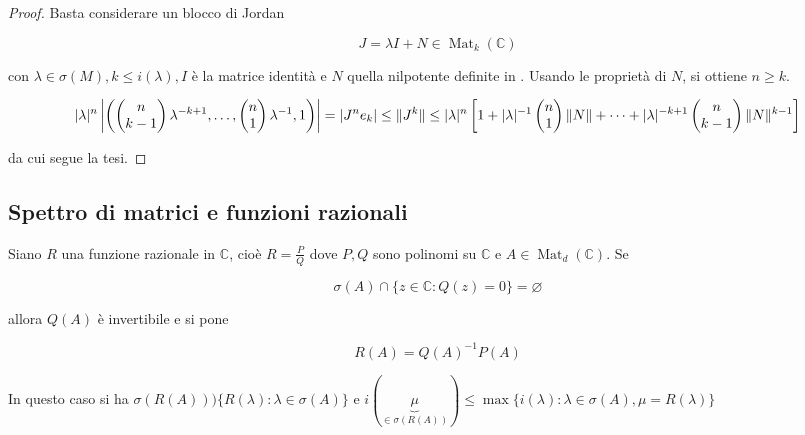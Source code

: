 \documentclass[hidelinks, 10pt]{report}
\DeclareMathOperator{\Mat}{Mat}
\begin{document}
\begin{proof}
Basta considerare un blocco di Jordan

\[ J = \lambda I + N \in \Mat_{k}(\mathbb{C}) \]

con $ \lambda \in \sigma(M), k \le i(\lambda), I $ \`e la matrice identit\`a e $ N $ quella nilpotente definite in . Usando le propriet\`a di $ N $, si ottiene $ n \ge k $. 

\begin{dmath*}
{ \vert \lambda \vert^{n} \left\vert \left( \begin{pmatrix} n \\ k - 1 \end{pmatrix} \lambda^{-k + 1}, \dotsc, \begin{pmatrix} n \\ 1 \end{pmatrix} \lambda^{-1}, 1 \right) \right\vert } = { \vert J^{n} e_{k} \vert } \le { \Vert J^{k} \Vert } \\ \le { \vert \lambda \vert^{n} \left[  1 + \vert \lambda \vert^{-1} \begin{pmatrix} n \\ 1 \end{pmatrix} \Vert N \Vert + \dotsb + \vert \lambda \vert^{-k + 1} \begin{pmatrix} n \\ k - 1 \end{pmatrix} \Vert N \Vert^{k - 1} \right] }
\end{dmath*}

da cui segue la tesi.
\end{proof}

\subsection{Spettro di matrici e funzioni razionali}	%
Siano $ R $ una funzione razionale in $ \mathbb{C} $, cio\`e $ R = \frac{P}{Q} $ dove $ P, Q $ sono polinomi su $ \mathbb{C} $ e $ A \in \Mat_{d} (\mathbb{C}) $. Se

\[ \sigma(A) \cap \{ z \in \mathbb{C} : Q(z) = 0 \} = \varnothing \]

allora $ Q(A) $ \`e invertibile e si pone

\[ R(A) = Q(A)^{-1} P(A) \]

In questo caso si ha $ \sigma(R(A)) ) \{ R(\lambda) : \lambda \in \sigma(A) \} $ e $ i(\underbrace{\mu}_{\in \sigma(R(A))}) \le \max \{ i(\lambda) : \lambda \in \sigma(A), \mu = R(\lambda) \} $
\end{document}
